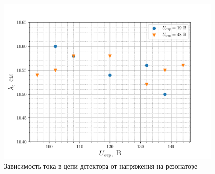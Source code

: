 \begin{figure}[H]
		\centering
		\includegraphics[width=\linewidth]{fig/task4b}
		\caption{Зависимость тока в цепи детектора от напряжения на резонаторе}
		\label{fig:task4b}
\end{figure}




